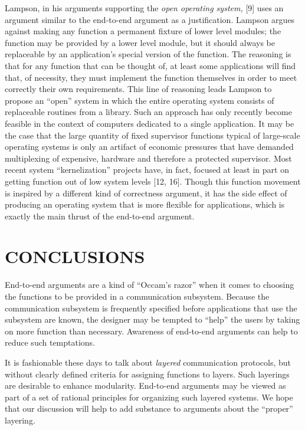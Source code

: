 \documentclass[a4paper,11pt,notitlepage,twoside,openright]{article}
\begin{document}
Lampson, in his arguments supporting the \emph{open operating system,}
{[}9{]} uses an argument similar to the end-to-end argument as a
justification. Lampson argues
against making any function a permanent fixture of lower level modules;
the function may be provided by a lower level module, but it should
always be replaceable by an application's special version of the
function. The reasoning is that for any function that can be thought of,
at least some applications will find that, of necessity, they must
implement the function themselves in order to meet correctly their own
requirements. This line of reasoning leads Lampson to propose an ``open''
system in which the entire operating system consists of replaceable
routines from a library. Such an approach has only recently become
feasible in the context of computers dedicated to a single application.
It may be the case that the large quantity of fixed supervisor functions
typical of large-scale operating systems is only an artifact of economic
pressures that have demanded multiplexing of expensive, hardware and
therefore a protected supervisor. Most recent system ``kernelization''
projects have, in fact, focused at least in part on getting function out
of low system levels {[}12, 16{]}. Though this function movement is
inspired by a different kind of correctness argument, it has the side
effect of producing an operating system that is more flexible for
applications, which is exactly the main thrust of the end-to-end
argument.


\hypertarget{conclusions}{%
\section{CONCLUSIONS}\label{conclusions}}

End-to-end arguments are a kind of ``Occam's razor'' when it comes to
choosing the functions to be provided in a communication subsystem.
Because the communication subsystem is frequently specified before
applications that use the subsystem are known, the designer may be
tempted to ``help'' the users by taking on more function than necessary.
Awareness of end-to-end arguments can help to reduce such temptations.

It is fashionable these days to talk about \emph{layered} communication
protocols, but without clearly defined criteria for assigning functions
to layers. Such layerings are desirable to enhance modularity.
End-to-end arguments may be viewed as part of a set of rational
principles for organizing such layered systems. We hope that our
discussion will help to add substance to arguments about the ``proper''
layering.
\end{document}
